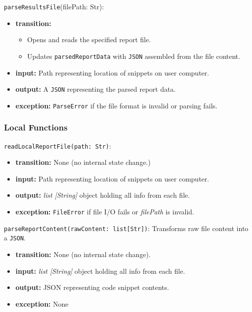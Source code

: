 \documentclass[12pt, titlepage]{article}
\begin{document}
\noindent \texttt{parseResultsFile}(filePath: Str):
\begin{itemize}
    \item \textbf{transition:}
    \begin{itemize}
        \item Opens and reads the specified report file.
        \item Updates \texttt{parsedReportData} with \texttt{JSON} assembled from the file content.
    \end{itemize}
    \item \textbf{input:} Path representing location of snippets on user computer.
    \item \textbf{output:} A \texttt{JSON} representing the parsed report data.
    \item \textbf{exception:} \texttt{ParseError} if the file format is invalid or parsing fails.
\end{itemize}

\subsubsection{Local Functions}

\noindent \texttt{readLocalReportFile(path: Str)}: 
\begin{itemize}
        \item \textbf{transition:} None (no internal state change.)
        \item \textbf{input:} Path representing location of snippets on user computer.
        \item \textbf{output:} \textit{list [String]} object holding all info from each file.
        \item \textbf{exception:} \texttt{FileError} if file I/O fails or \textit{filePath} is invalid.
\end{itemize}

\noindent \texttt{parseReportContent(rawContent: list[Str])}: Transforms raw file content into a \texttt{JSON}.
\begin{itemize}
        \item \textbf{transition:} None (no internal state change).
        \item \textbf{input:}  \textit{list [String]} object holding all info from each
        file.
        \item \textbf{output:} JSON representing code snippet contents.
        \item \textbf{exception:} None
\end{itemize}
\end{document}
